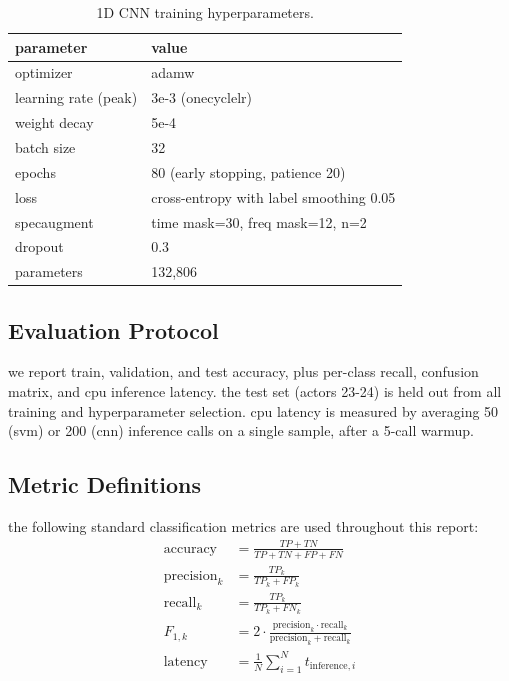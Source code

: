 \documentclass[conference]{IEEEtran}
\begin{document}
{\begin{table}[H]
\centering
\caption{1D CNN training hyperparameters.}
\label{tab:cnn-hyperparams}
\begin{tabular}{@{}ll@{}}

\toprule
parameter & value \\
\midrule
optimizer & adamw \\
learning rate (peak) & 3e-3 (onecyclelr) \\
weight decay & 5e-4 \\
batch size & 32 \\
epochs & 80 (early stopping, patience 20) \\
loss & cross-entropy with label smoothing 0.05 \\
specaugment & time mask=30, freq mask=12, n=2 \\
dropout & 0.3 \\
parameters & 132,806 \\
\bottomrule
\end{tabular}
\end{table}


\subsection{Evaluation Protocol}\label{evaluation-protocol}

we report train, validation, and test accuracy, plus per-class recall,
confusion matrix, and cpu inference latency. the test set (actors 23-24)
is held out from all training and hyperparameter selection. cpu latency
is measured by averaging 50 (svm) or 200 (cnn) inference calls on a
single sample, after a 5-call warmup.

\subsection{Metric Definitions}\label{metric-definitions}
the following standard classification metrics are used throughout this report:
\begin{align}
\text{accuracy}      &= \frac{TP + TN}{TP + TN + FP + FN} \label{eq:accuracy} \\
\text{precision}_k   &= \frac{TP_k}{TP_k + FP_k} \label{eq:precision} \\
\text{recall}_k      &= \frac{TP_k}{TP_k + FN_k} \label{eq:recall} \\
F_{1,k}             &= 2 \cdot \frac{\text{precision}_k \cdot \text{recall}_k}
                           {\text{precision}_k + \text{recall}_k} \label{eq:f1} \\
\text{latency}       &= \frac{1}{N} \sum_{i=1}^{N} t_{\text{inference},i} \label{eq:latency}
\end{align}

}
\end{document}
